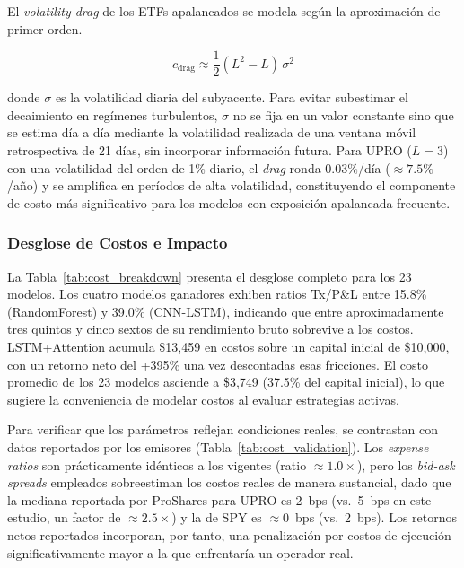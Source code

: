 El \textit{volatility drag} de los ETFs apalancados se modela seg\'un la aproximaci\'on de primer orden.

\begin{equation}
c_{\text{drag}} \approx \frac{1}{2}(L^2 - L)\,\sigma^2
\label{eq:vol_drag}
\end{equation}

\noindent donde $\sigma$ es la volatilidad diaria del subyacente. Para evitar subestimar el decaimiento en reg\'imenes turbulentos, $\sigma$ no se fija en un valor constante sino que se estima d\'ia a d\'ia mediante la volatilidad realizada de una ventana m\'ovil retrospectiva de 21 d\'ias, sin incorporar informaci\'on futura. Para UPRO ($L = 3$) con una volatilidad del orden de 1\% diario, el \textit{drag} ronda $0.03\%$/d\'ia ($\approx 7.5\%$/a\~no) y se amplifica en per\'iodos de alta volatilidad, constituyendo el componente de costo m\'as significativo para los modelos con exposici\'on apalancada frecuente.


\subsubsection{Desglose de Costos e Impacto}
\label{subsec:cost_breakdown}

La Tabla~\ref{tab:cost_breakdown} presenta el desglose completo para los 23 modelos. Los cuatro modelos ganadores exhiben ratios Tx/P\&L entre 15.8\% (RandomForest) y 39.0\% (CNN-LSTM), indicando que entre aproximadamente tres quintos y cinco sextos de su rendimiento bruto sobrevive a los costos. LSTM+Attention acumula \$13,459 en costos sobre un capital inicial de \$10,000, con un retorno neto del +395\% una vez descontadas esas fricciones. El costo promedio de los 23 modelos asciende a \$3,749 (37.5\% del capital inicial), lo que sugiere la conveniencia de modelar costos al evaluar estrategias activas.

Para verificar que los par\'ametros reflejan condiciones reales, se contrastan con datos reportados por los emisores \citep{proshares2026,statestreet2026} (Tabla~\ref{tab:cost_validation}). Los \textit{expense ratios} son pr\'acticamente id\'enticos a los vigentes (ratio $\approx 1.0\times$), pero los \textit{bid-ask spreads} empleados sobreestiman los costos reales de manera sustancial, dado que la mediana reportada por ProShares para UPRO es 2~bps (vs.\ 5~bps en este estudio, un factor de $\approx 2.5\times$) y la de SPY es $\approx$0~bps (vs.\ 2~bps). Los retornos netos reportados incorporan, por tanto, una penalizaci\'on por costos de ejecuci\'on significativamente mayor a la que enfrentar\'ia un operador real.

